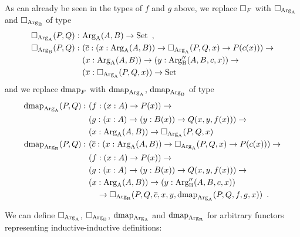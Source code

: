 \documentclass[orivec,envcountsame, ,envcountsect]{llncs}
\begin{document}
\noindent As can already be seen in the types of $f$ and $g$ above, we replace
$\Box_F$ with $\Box_{\text{Arg}_{\text{A}}}$ and $\Box_{\text{Arg}_{\text{B}}}$ of type
\begin{align*}
  \BOX_{\ArgA}(P, Q) :\ &\ArgA(A, B) \to \Set \enspace ,\\
%
  \BOX_{\ArgB}(P, Q) :\ %
                     &(\overline{c} : (x : \ArgA(A, B)) \to \BOX_{\ArgA}(P, Q, x) \to P(c(x))) \to \\
                     &(x : \ArgA(A, B)) \to (y : \ArgB''(A, B, c, x)) \to \\
                     & (\overline{x} : \BOX_{\ArgA}(P, Q, x)) \to \Set
\end{align*} %
%
and we replace $\text{dmap}_F$ with $\text{dmap}_{\text{Arg}_{\text{A}}}$, $\text{dmap}_{\text{Arg}_{\text{B}}}$ of type
\begin{align*}
  \dmap_{\ArgA}(P, Q) :\ & (f : (x : A) \to P(x)) \to \\
                 & (g : (x : A) \to (y : B(x)) \to Q(x, y, f(x))) \to \\
                 & (x : \ArgA(A, B)) \to \BOX_{\ArgA}(P, Q, x) \\
%
  \dmap_{\ArgB}(P, Q) :\ &(\overline{c} : (x : \ArgA(A, B)) \to \BOX_{\ArgA}(P, Q, x) \to P(c(x))) \to \\
                 & (f : (x : A) \to P(x)) \to \\
                 & (g : (x : A) \to (y : B(x)) \to Q(x, y, f(x))) \to \\
                 & (x : \ArgA(A, B)) \to (y : \ArgB''(A, B, c, x)) \\ 
                 & \quad \to \BOX_{\ArgB}(P, Q, \overline{c}, x, y, \dmap_{\ArgA}(P, Q, f, g, x)) \enspace .
\end{align*}

We can define $\Box_{\text{Arg}_{\text{A}}}$, $\Box_{\text{Arg}_{\text{B}}}$, $\text{dmap}_{\text{Arg}_{\text{A}}}$ and $\text{dmap}_{\text{Arg}_{\text{B}}}$ for arbitrary functors
representing inductive-inductive definitions:
\end{document}
